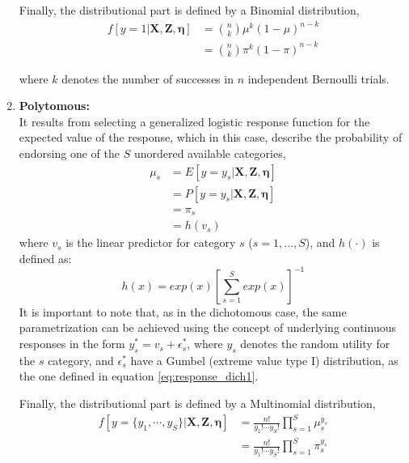 \begin{enumerate}
	Finally, the distributional part is defined by a Binomial distribution,
	\begin{equation} \label{eq:dist_dich}
		\begin{split}
		f[y=1 | \mathbf{X}, \mathbf{Z}, \pmb{\eta}] &= \binom{n}{k} \mu^{k} (1-\mu)^{n-k} \\
		&= \binom{n}{k} \pi^{k} (1-\pi)^{n-k}
		\end{split}
	\end{equation}

	where $k$ denotes the number of successes in $n$ independent Bernoulli trials.
	
	
			
	\item \textbf{Polytomous:} \\	
	It results from selecting a generalized logistic response function \citep{Bock_1972} for the expected value of the response, which in this case, describe the probability of endorsing one of the $S$ unordered available categories,
	\begin{equation} \label{eq:link_poly}
		\begin{split}
		\mu_{s} &= E[y=y_{s} | \mathbf{X}, \mathbf{Z}, \pmb{\eta}] \\
		&= P[y=y_{s} | \mathbf{X}, \mathbf{Z}, \pmb{\eta}] \\
		& = \pi_{s} \\
		&= h(v_{s})
		\end{split}
	\end{equation}	
	where $v_{s}$ is the linear predictor for category $s$ ($s=1, \dots, S$), and $h(\cdot)$ is defined as:
	\begin{equation} \label{eq:response_poly}
		h(x) = exp(x)\left[\sum_{s=1}^{S} exp(x)\right]^{-1}
	\end{equation}
	It is important to note that, as in the dichotomous case, the same parametrization can be achieved using the concept of underlying continuous responses in the form $y_{s}^{*} = v_{s} + \epsilon_{s}^{*}$, where $y_{s}$ denotes the random utility for the $s$ category, and $\epsilon_{s}^{*}$ have a Gumbel (extreme value type I) distribution, as the one defined in equation \ref{eq:response_dich1}.
	
	Finally, the distributional part is defined by a Multinomial distribution,
	\begin{equation} \label{eq:dist_poly}
		\begin{split}
		f[y=\{y_{1}, \cdots, y_{S}\} | \mathbf{X}, \mathbf{Z}, \pmb{\eta}] &= \frac{n!}{y_{1}! \cdots y_{S}!} \prod_{s=1}^{S} \mu_{s}^{y_{s}} \\
		&= \frac{n!}{y_{1}! \cdots y_{S}!} \prod_{s=1}^{S} \pi_{s}^{y_{s}}
		\end{split}
	\end{equation}
	

\end{enumerate}

